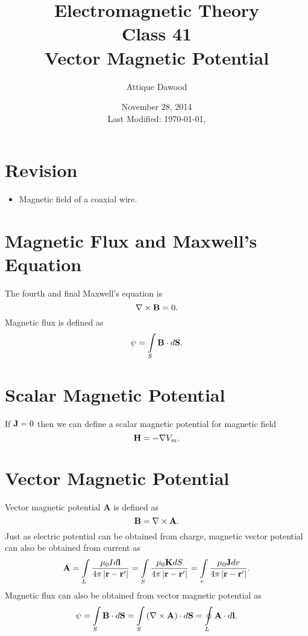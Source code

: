 \documentclass[12pt,a4paper]{article}
\title{Electromagnetic Theory\\Class 41\\Vector Magnetic Potential}
\author{Attique Dawood}
\date{November 28, 2014\\[0.2cm] Last Modified: \today, \currenttime}
\begin{document}
\maketitle
\section{Revision}
\begin{itemize}
\item Magnetic field of a coaxial wire.
\end{itemize}
\section{Magnetic Flux and Maxwell's Equation}
The fourth and final Maxwell's equation is
\begin{equation}
\nabla\times\mathrm{\textbf B}=0.
\end{equation}
Magnetic flux is defined as
\begin{equation}
\psi=\int\limits_S\mathrm{\textbf B}\cdot d\mathrm{\textbf S}.
\end{equation}
\section{Scalar Magnetic Potential}
If $\mathrm{\textbf J}=0$ then we can define a scalar magnetic potential for magnetic field
\begin{equation}
\mathrm{\textbf H}=-\nabla V_m.
\end{equation}
\section{Vector Magnetic Potential}
Vector magnetic potential \textbf{A} is defined as
\begin{equation}
\mathrm{\textbf B}=\nabla\times\mathrm{\textbf A}.
\end{equation}
Just as electric potential can be obtained from charge, magnetic vector potential can also be obtained from current as
\begin{equation}
\mathrm{\textbf A}=\int\limits_L\dfrac{\mu_0Id\textbf{l}}{4\pi\left|\mathrm{\textbf r}-\mathrm{\textbf r}'\right|}=\int\limits_S\dfrac{\mathrm{\mu_0\textbf K}dS}{4\pi\left|\mathrm{\textbf r}-\mathrm{\textbf r}'\right|}=\int\limits_v\dfrac{\mu_0\mathrm{\textbf J}dv}{4\pi\left|\mathrm{\textbf r}-\mathrm{\textbf r}'\right|}.
\end{equation}
Magnetic flux can also be obtained from vector magnetic potential as
\begin{equation}
\psi=\int\limits_S\mathrm{\textbf B}\cdot d\mathrm{\textbf S}=\int\limits_S\left(\nabla\times\mathrm{\textbf A}\right)\cdot d\mathrm{\textbf S}=\oint\limits_L\mathrm{\textbf A}\cdot d\textbf l.
\end{equation}
\end{document}
